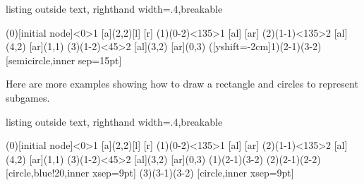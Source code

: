 \begin{tcblisting}{listing outside text, righthand width=.4\linewidth,breakable}
\begin{istgame}
\xtdistance{15mm}{30mm}
\istroot[-135](0)[initial node]<0>{1}
  [a]{(2,2)}[l]
  [r]   \endist 
\istroot(1)(0-2)<135>{1}
  [al]
  [ar]  \endist 
\xtdistance{10mm}{20mm}
\istroot(2)(1-1)<135>{2}
  \istb{\ell}[al]{(4,2)}
  [ar]{(1,1)}
  \endist 
\istroot(3)(1-2)<45>{2}
  \istb{\ell}[al]{(3,2)}
  [ar]{(0,3)}
  \endist 
\xtSubgameBox([yshift=-2cm]1){(2-1)(3-2)}%
    [semicircle,inner sep=15pt]
\end{istgame}
\end{tcblisting}



Here are more examples showing how to draw a rectangle and circles to represent subgames.

\begin{tcblisting}{listing outside text, righthand width=.4\linewidth,breakable}
\begin{istgame}
\xtdistance{15mm}{30mm}
\istroot[-135](0)[initial node]<0>{1}
  [a]{(2,2)}[l]
  [r]   \endist 
\istroot(1)(0-2)<135>{1}
  [al]
  [ar]  \endist 
\xtdistance{10mm}{20mm}
\istroot(2)(1-1)<135>{2}
  \istb{\ell}[al]{(4,2)}
  [ar]{(1,1)}
  \endist 
\istroot(3)(1-2)<45>{2}
  \istb{\ell}[al]{(3,2)}
  [ar]{(0,3)}
  \endist 
\xtSubgameBox*(1){(2-1)(3-2)}
\xtSubgameOval*(2){(2-1)(2-2)}%
  [circle,blue!20,inner xsep=9pt]
\xtSubgameOval(3){(3-1)(3-2)}%
  [circle,inner xsep=9pt]
\end{istgame}
\end{tcblisting}


